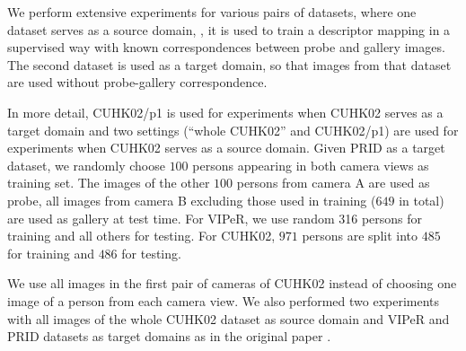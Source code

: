  We perform extensive experiments for various pairs of datasets, where one dataset serves as a source domain, \ie, it is used to train a descriptor mapping in a supervised way with known correspondences between probe and gallery images. The second dataset is used as a target domain, so that images from that dataset are used without probe-gallery correspondence.

 In more detail, CUHK02/p1 is used for experiments when CUHK02 serves as a target domain and two settings (``whole CUHK02'' and CUHK02/p1) are used for experiments when CUHK02 serves as a source domain. Given PRID as a target dataset, we randomly choose $100$ persons appearing in both camera views as training set. The images of the other $100$ persons from camera A are used as probe, all images from camera B excluding those used in training ($649$ in total) are used as gallery at test time. For VIPeR, we use random 316 persons for training and all others for testing. For CUHK02, $971$ persons are split into $485$ for training and $486$ for testing.
 
We use all images in the first  pair of cameras of CUHK02 instead of choosing one image of a person from each camera view. We also performed two experiments with all images of the whole CUHK02 dataset as source domain and VIPeR and PRID datasets as target domains as in the  original paper \citep{Yi14}.
\newlength\reidheight
\setlength{\reidheight}{2.5cm}

\addtolength{\tabcolsep}{-3pt}


